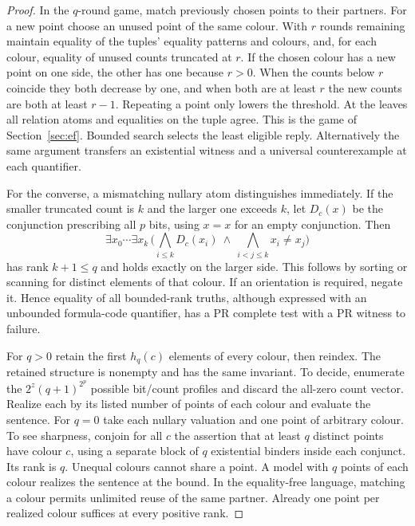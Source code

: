 \begin{proof}
In the $q$-round game, match previously chosen points to their partners. For a new point choose an unused point of the same colour. With $r$ rounds remaining maintain equality of the tuples' equality patterns and colours, and, for each colour, equality of unused counts truncated at $r$. If the chosen colour has a new point on one side, the other has one because $r>0$. When the counts below $r$ coincide they both decrease by one, and when both are at least $r$ the new counts are both at least $r-1$. Repeating a point only lowers the threshold. At the leaves all relation atoms and equalities on the tuple agree. This is the game of Section~\ref{sec:ef}. Bounded search selects the least eligible reply. Alternatively the same argument transfers an existential witness and a universal counterexample at each quantifier.

For the converse, a mismatching nullary atom distinguishes immediately. If the smaller truncated count is $k$ and the larger one exceeds $k$, let $D_c(x)$ be the conjunction prescribing all $p$ bits, using $x=x$ for an empty conjunction. Then
\[
 \exists x_0\cdots\exists x_k\,
  \Big(\bigwedge_{i\le k}D_c(x_i)\ \wedge\
                  \bigwedge_{i<j\le k}x_i\ne x_j\Big)
\]
has rank $k+1\le q$ and holds exactly on the larger side. This follows by sorting or scanning for distinct elements of that colour. If an orientation is required, negate it. Hence equality of all bounded-rank truths, although expressed with an unbounded formula-code quantifier, has a PR complete test with a PR witness to failure.

For $q>0$ retain the first $h_q(c)$ elements of every colour, then reindex. The retained structure is nonempty and has the same invariant. To decide, enumerate the $2^z(q+1)^{2^p}$ possible bit/count profiles and discard the all-zero count vector. Realize each by its listed number of points of each colour and evaluate the sentence. For $q=0$ take each nullary valuation and one point of arbitrary colour. To see sharpness, conjoin for all $c$ the assertion that at least $q$ distinct points have colour $c$, using a separate block of $q$ existential binders inside each conjunct. Its rank is $q$. Unequal colours cannot share a point. A model with $q$ points of each colour realizes the sentence at the bound. In the equality-free language, matching a colour permits unlimited reuse of the same partner. Already one point per realized colour suffices at every positive rank.
\end{proof}

